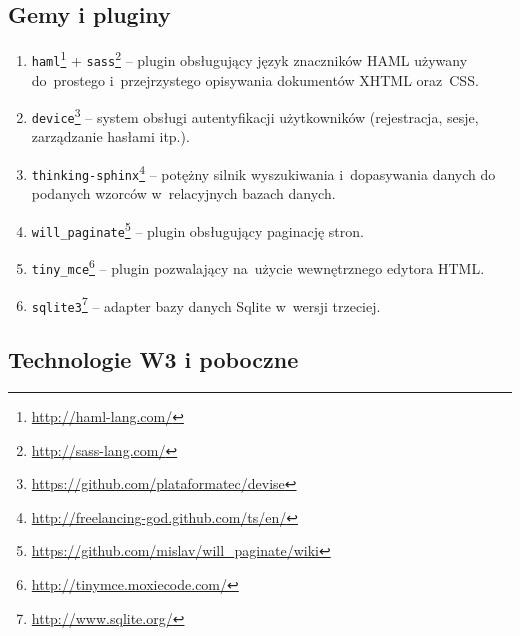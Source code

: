 
\subsection{Gemy i pluginy} \label{technologie.gemy}

\begin{enumerate}
  \item \texttt{haml}\footnote{\url{http://haml-lang.com/}} + \texttt{sass}\footnote{\url{http://sass-lang.com/}} -- plugin obsługujący język znaczników HAML używany do~prostego i~przejrzystego opisywania dokumentów XHTML oraz~CSS.
  \item \texttt{device}\footnote{\url{https://github.com/plataformatec/devise}} -- system obsługi autentyfikacji użytkowników (rejestracja, sesje, zarządzanie hasłami itp.).
  \item \texttt{thinking-sphinx}\footnote{\url{http://freelancing-god.github.com/ts/en/}} -- potężny silnik wyszukiwania i~dopasywania danych do podanych wzorców w~relacyjnych bazach danych.
  \item \texttt{will\_paginate}\footnote{\url{https://github.com/mislav/will\_paginate/wiki}} -- plugin obsługujący paginację stron.
  \item \texttt{tiny\_mce}\footnote{\url{http://tinymce.moxiecode.com/}} -- plugin pozwalający na~użycie wewnętrznego edytora HTML.
  \item \texttt{sqlite3}\footnote{\url{http://www.sqlite.org/}} -- adapter bazy danych Sqlite w~wersji trzeciej.
\end{enumerate}


\subsection{Technologie W3 i poboczne} \label{technologie.web}

